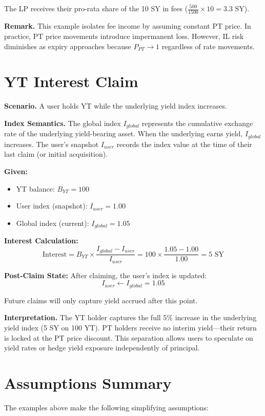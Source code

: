 The LP receives their pro-rata share of the 10 SY in fees ($\frac{500}{1500} \times 10 = 3.3$ SY).

\textbf{Remark.}
This example isolates fee income by assuming constant PT price. In practice, PT price movements introduce impermanent loss. However, IL risk diminishes as expiry approaches because $P_{PT} \to 1$ regardless of rate movements.


\section{YT Interest Claim}

\textbf{Scenario.}
A user holds YT while the underlying yield index increases.

\textbf{Index Semantics.}
The global index $I_{global}$ represents the cumulative exchange rate of the underlying yield-bearing asset. When the underlying earns yield, $I_{global}$ increases. The user's snapshot $I_{user}$ records the index value at the time of their last claim (or initial acquisition).

\textbf{Given:}
\begin{itemize}
\item YT balance: $B_{YT} = 100$
\item User index (snapshot): $I_{user} = 1.00$
\item Global index (current): $I_{global} = 1.05$
\end{itemize}

\textbf{Interest Calculation:}
\[
\text{Interest} = B_{YT} \times \frac{I_{global} - I_{user}}{I_{user}} = 100 \times \frac{1.05 - 1.00}{1.00} = 5 \text{ SY}
\]

\textbf{Post-Claim State:}
After claiming, the user's index is updated:
\[
I_{user} \leftarrow I_{global} = 1.05
\]

Future claims will only capture yield accrued after this point.

\textbf{Interpretation.}
The YT holder captures the full 5\% increase in the underlying yield index (5 SY on 100 YT). PT holders receive no interim yield---their return is locked at the PT price discount. This separation allows users to speculate on yield rates or hedge yield exposure independently of principal.


\section{Assumptions Summary}

The examples above make the following simplifying assumptions:

